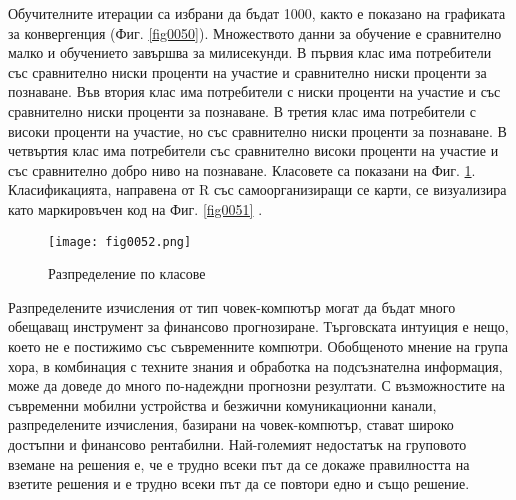 Обучителните итерации са избрани да бъдат 1000, както е показано на графиката за конвергенция (Фиг. \ref{fig0050}). Множеството данни за обучение е сравнително малко и обучението завършва за милисекунди. В първия клас има потребители със сравнително ниски проценти на участие и сравнително ниски проценти за познаване. Във втория клас има потребители с ниски проценти на участие и със сравнително ниски проценти за познаване. В третия клас има потребители с високи проценти на участие, но със сравнително ниски проценти за познаване. В четвъртия клас има потребители със сравнително високи проценти на участие и със сравнително добро ниво на познаване. Класовете са показани на Фиг. \ref{fig0052}. Класификацията, направена от R със самоорганизиращи се карти, се визуализира като маркировъчен код на Фиг. \ref{fig0051} \cite{Tomov-03}.

\begin{figure}[H]
  \centering
  \texttt{[image: fig0052.png]}
  \caption{Разпределение по класове}
\label{fig0052}
\end{figure}

Разпределените изчисления от тип човек-компютър могат да бъдат много обещаващ инструмент за финансово прогнозиране. Търговската интуиция е нещо, което не е постижимо със съвременните компютри. Обобщеното мнение на група хора, в комбинация с техните знания и обработка на подсъзнателна информация, може да доведе до много по-надеждни прогнозни резултати. С възможностите на съвременни мобилни устройства и безжични комуникационни канали, разпределените изчисления, базирани на човек-компютър, стават широко достъпни и финансово рентабилни. Най-големият недостатък на груповото вземане на решения е, че е трудно всеки път да се докаже правилността на взетите решения и е трудно всеки път да се повтори едно и също решение.

